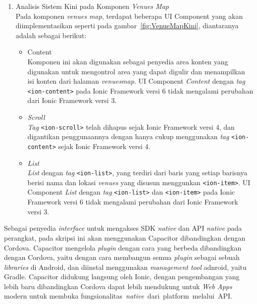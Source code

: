 \begin{enumerate}
\begin{enumerate}
\begin{itemize}
	\end{itemize}
		\item Analisis Sistem Kini pada Komponen \textit{Venues Map} \\
		Pada komponen \textit{venues map}, terdapat beberapa UI Component yang akan diimplementasikan seperti pada gambar~\ref{fig:VenueMapKini}, diantaranya adalah sebagai berikut:
	\begin{itemize}
			\item Content \\
		Komponen ini akan digunakan sebagai penyedia area konten yang digunakan untuk mengontrol area yang dapat digulir dan menampilkan isi konten dari halaman \textit{venues\textunderscore map}. UI Component \textit{Content} dengan \textit{tag} \texttt{<ion-content>} pada Ionic Framework versi 6 tidak mengalami perubahan dari Ionic Framework versi 3.

			\item \textit{Scroll} \\
			\textit{Tag} \texttt{<ion-scroll>} telah dihapus sejak Ionic Framework versi 4, dan digantikan penggunaannya dengan hanya cukup menggunakan \textit{tag} \texttt{<ion-content>} sejak Ionic Framework versi 4.
		
			\item \textit{List} \\
		\textit{List} dengan \textit{tag} \texttt{<ion-list>}, yang terdiri dari baris yang setiap barisnya berisi nama dan lokasi \textit{venues} yang disusun menggunkan \texttt{<ion-item>}. UI Component \textit{List} dengan \textit{tag} \texttt{<ion-list>} dan \texttt{<ion-item>} pada Ionic Framework versi 6 tidak mengalami perubahan dari Ionic Framework versi 3.
		\end{itemize}
	\end{enumerate}
	
\end{enumerate}
Sebagai penyedia \textit{interface} untuk mengakses SDK \textit{native} dan API \textit{native} pada perangkat, pada skripsi ini akan menggunakan Capacitor dibandingkan dengan Cordova. Capacitor mengelola \textit{plugin} dengan cara yang berbeda dibandingkan dengan Cordova, yaitu dengan cara membangun semua \textit{plugin} sebagai sebuah \textit{libraries} di Android, dan diinstal menggunakan \textit{management tool} adnroid, yaitu Gradle. Capacitor didukung langsung oleh Ionic, dengan pengembangan yang lebih baru dibandingkan Cordova dapat lebih mendukung untuk \textit{Web Apps} modern untuk membuka fungsionalitas~\textit{native}~dari~platform~melalui~API.

